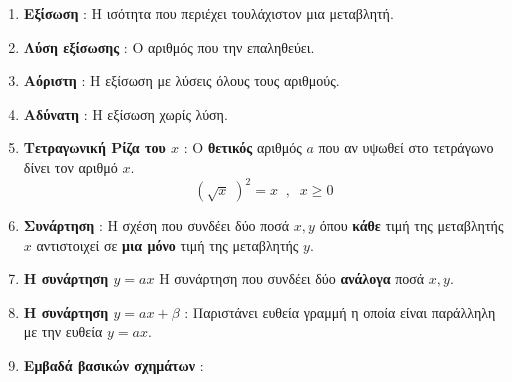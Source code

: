 \documentclass[11pt,a4paper]{article}
\begin{document}
\begin{enumerate}
\item \textbf{Εξίσωση} : Η ισότητα που περιέχει τουλάχιστον μια μεταβλητή.
\item \textbf{Λύση εξίσωσης} : Ο αριθμός που την επαληθεύει.
\item \textbf{Αόριστη} : Η εξίσωση με λύσεις όλους τους αριθμούς.
\item \textbf{Αδύνατη} : Η εξίσωση χωρίς λύση.
\item \textbf{Τετραγωνική Ρίζα του $ x $} : Ο \textbf{θετικός} αριθμός $ a $ που αν υψωθεί στο τετράγωνο δίνει τον αριθμό $ x $.
\[ \left(\sqrt{x}\;\right)^2=x\;\;,\;\; x\geq0 \]
\item \textbf{Συνάρτηση} : H σχέση που συνδέει δύο ποσά $ x,y $ όπου \textbf{κάθε} τιμή της μεταβλητής $ x $ αντιστοιχεί σε \textbf{μια μόνο} τιμή της μεταβλητής $ y $.
\item \textbf{Η συνάρτηση $ y=ax $} Η συνάρτηση που συνδέει δύο \textbf{ανάλογα} ποσά $ x,y $. 
\item \textbf{Η συνάρτηση $ y=ax+\beta $} : Παριστάνει ευθεία γραμμή η οποία είναι παράλληλη με την ευθεία $ y=ax $. 
\item \textbf{Εμβαδά βασικών σχημάτων} :
\begin{center}
\quad{}
\end{center}
\end{enumerate}
\end{document}
